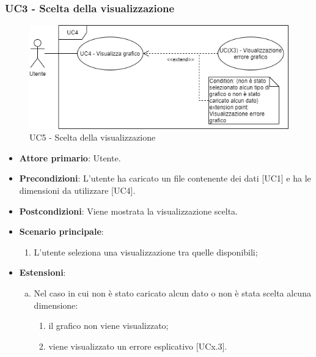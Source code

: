 \subsubsection{UC3 - Scelta della visualizzazione}
\begin{figure}[h]
\includegraphics[width=\linewidth]{section/Images/UC5SceltaVisualizzazione.png}
\centering
\caption{UC5 - Scelta della visualizzazione}
\end{figure}
\begin{itemize}
	\item \textbf{Attore primario}: Utente.
	\item \textbf{Precondizioni}: L'utente ha caricato un file contenente dei dati [UC1] e ha le dimensioni da utilizzare [UC4].
	\item \textbf{Postcondizioni}: Viene mostrata la visualizzazione scelta.
	\item \textbf{Scenario principale}:
		\begin{enumerate}
			\item L'utente seleziona una visualizzazione tra quelle disponibili;
		\end{enumerate}
	\item \textbf{Estensioni}:
	\begin{enumerate}[(a)]
		\item Nel caso in cui non è stato caricato alcun dato o non è stata scelta alcuna dimensione:
		\begin{enumerate}[1.]
			\item il grafico non viene visualizzato;
			\item viene visualizzato un errore esplicativo [UCx.3].
		\end{enumerate}
	\end{enumerate}
\end{itemize}